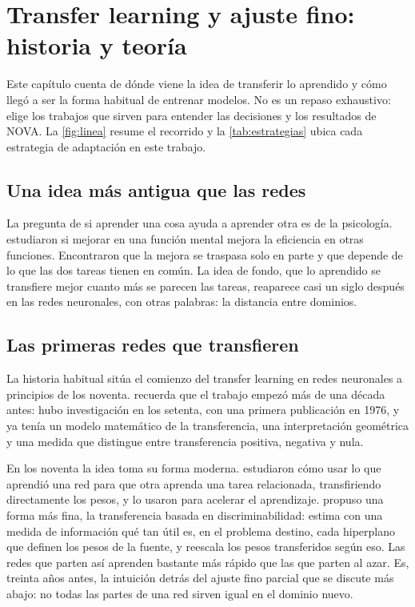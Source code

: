 \chapter{Transfer learning y ajuste fino: historia y teoría}\label{cap:historia}

Este capítulo cuenta de dónde viene la idea de transferir lo aprendido y cómo llegó a ser la forma habitual de
entrenar modelos. No es un repaso exhaustivo: elige los trabajos que sirven para entender las decisiones y los
resultados de NOVA. La \cref{fig:linea} resume el recorrido y la \cref{tab:estrategias} ubica cada estrategia de adaptación
en este trabajo.

\section{Una idea más antigua que las redes}

La pregunta de si aprender una cosa ayuda a aprender otra es de la psicología. \textcite{thorndike1901} estudiaron si
mejorar en una función mental mejora la eficiencia en otras funciones. Encontraron que la mejora se traspasa solo en
parte y que depende de lo que las dos tareas tienen en común. La idea de
fondo, que lo aprendido se transfiere mejor cuanto más se parecen las tareas, reaparece casi un siglo después en las
redes neuronales, con otras palabras: la distancia entre dominios.

\section{Las primeras redes que transfieren}

La historia habitual sitúa el comienzo del transfer learning en redes neuronales a principios de los noventa.
\textcite{bozinovski2020} recuerda que el trabajo empezó más de una década antes: hubo investigación en los setenta, con
una primera publicación en 1976, y ya tenía un modelo matemático de la transferencia, una interpretación geométrica y
una medida que distingue entre transferencia positiva, negativa y nula.

En los noventa la idea toma su forma moderna. \textcite{pratt1991} estudiaron cómo usar lo que aprendió una red para
que otra aprenda una tarea relacionada, transfiriendo directamente los pesos, y lo usaron para acelerar el
aprendizaje. \textcite{pratt1993} propuso una forma más fina, la transferencia basada en discriminabilidad: estima con
una medida de información qué tan útil es, en el problema destino, cada hiperplano que definen los pesos de la fuente,
y reescala los pesos transferidos según eso. Las redes que parten así aprenden bastante más rápido que las que parten
al azar. Es, treinta años antes, la intuición detrás del ajuste fino parcial que se discute más abajo: no todas las
partes de una red sirven igual en el dominio nuevo.

